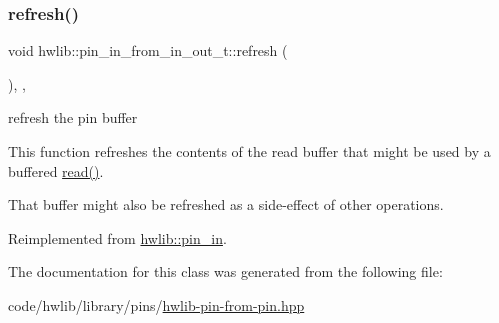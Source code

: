 \subsubsection{\texorpdfstring{refresh()}{refresh()}}
{\footnotesize\ttfamily void hwlib\+::pin\+\_\+in\+\_\+from\+\_\+in\+\_\+out\+\_\+t\+::refresh (\begin{DoxyParamCaption}{ }\end{DoxyParamCaption})\hspace{0.3cm}{\ttfamily [inline]}, {\ttfamily [override]}, {\ttfamily [virtual]}}





refresh the pin buffer

This function refreshes the contents of the read buffer that might be used by a buffered \hyperlink{classhwlib_1_1pin__in__from__in__out__t_ae2f49f0010b6a6177fad9099e3d7cbd2}{read()}.

That buffer might also be refreshed as a side-\/effect of other operations. 

Reimplemented from \hyperlink{classhwlib_1_1pin__in_a3fb1bfb1ec962bb6d31a5e865f0d0acb}{hwlib\+::pin\+\_\+in}.



The documentation for this class was generated from the following file\+:\begin{DoxyCompactItemize}
\item 
code/hwlib/library/pins/\hyperlink{hwlib-pin-from-pin_8hpp}{hwlib-\/pin-\/from-\/pin.\+hpp}\end{DoxyCompactItemize}
